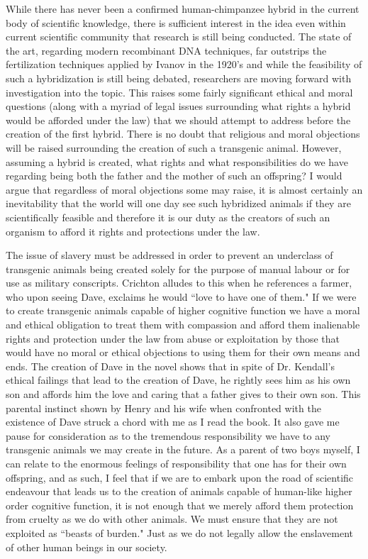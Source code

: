 \documentclass[letterpaper,10pt,twoside]{article}
\begin{document}
While there has never been a confirmed human-chimpanzee hybrid in the current body of scientific knowledge, there is sufficient interest in the idea even within current scientific community that research is still being conducted.  The state of the art, regarding modern recombinant DNA techniques, far outstrips the fertilization techniques applied by Ivanov in the 1920's and while the feasibility of such a hybridization is still being debated, researchers are moving forward with investigation into the topic.  This raises some fairly significant ethical and moral questions (along with a myriad of legal issues surrounding what rights a hybrid would be afforded under the law) that we should attempt to address before the creation of the first hybrid.  There is no doubt that religious and moral objections will be raised surrounding the creation of such a transgenic animal.  However, assuming a hybrid is created, what rights and what responsibilities do we have regarding being both the father and the mother of such an offspring?  I would argue that regardless of moral objections some may raise, it is almost certainly an inevitability that the world will one day see such hybridized animals if they are scientifically feasible and therefore it is our duty as the creators of such an organism to afford it rights and protections under the law.

The issue of slavery must be addressed in order to prevent an underclass of transgenic animals being created solely for the purpose of manual labour or for use as military conscripts.  Crichton alludes to this when he references a farmer, who upon seeing Dave, exclaims he would ``love to have one of them."  If we were to create transgenic animals capable of higher cognitive function we have a moral and ethical obligation to treat them with compassion and afford them inalienable rights and protection under the law from abuse or exploitation by those that would have no moral or ethical objections to using them for their own means and ends.  The creation of Dave in the novel shows that in spite of Dr. Kendall's ethical failings that lead to the creation of Dave, he rightly sees him as his own son and affords him the love and caring that a father gives to their own son.  This parental instinct shown by Henry and his wife when confronted with the existence of Dave struck a chord with me as I read the book.  It also gave me pause for consideration as to the tremendous responsibility we have to any transgenic animals we may create in the future.  As a parent of two boys myself, I can relate to the enormous feelings of responsibility that one has for their own offspring, and as such, I feel that if we are to embark upon the road of scientific endeavour that leads us to the creation of animals capable of human-like higher order cognitive function, it is not enough that we merely afford them protection from cruelty as we do with other animals.  We must ensure that they are not exploited as ``beasts of burden."  Just as we do not legally allow the enslavement of other human beings in our society.
\end{document}
